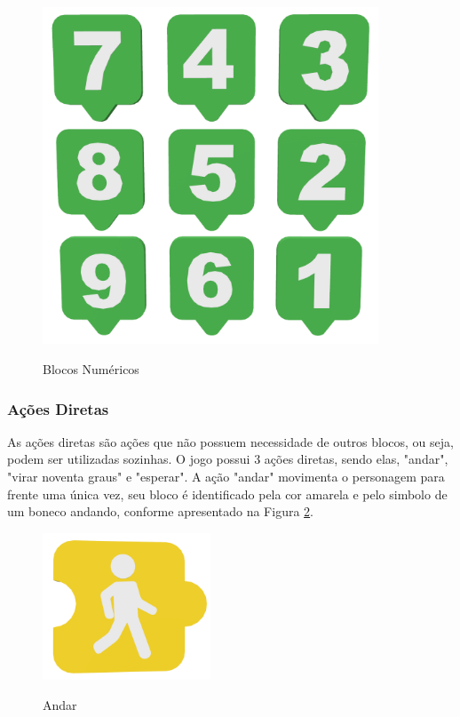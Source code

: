         \begin{figure}[H]
            \caption{Blocos Numéricos}
            \centering
            \includegraphics[width=10cm]{Imagens/Cap3/Blocos/Blocos_Numericos.png}
            \label{figura:blocos_numericos}
        \end{figure}
    
    \subsubsection{Ações Diretas}
        As ações diretas são ações que não possuem necessidade de outros blocos, ou seja, podem ser utilizadas sozinhas.
        O jogo possui 3 ações diretas, sendo elas, "andar", "virar noventa graus" e "esperar". 
        A ação "andar" movimenta o personagem para frente uma única vez, seu bloco é identificado pela cor amarela e pelo simbolo de um boneco andando, conforme apresentado na Figura \ref{figura:andar}.
        
        \begin{figure}[H]
            \caption{Andar}
            \centering
            \includegraphics[width=5cm]{Imagens/Cap3/Blocos/Andar.png}
            \label{figura:andar}
        \end{figure}
        
